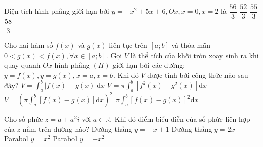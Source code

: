 \begin{ex}%
Diện tích hình phẳng giới hạn bởi $y = -x^2 + 5x + 6, Ox, x = 0, x = 2$ là
\choice
{$\dfrac{56}{3}$}
{$\dfrac{52}{3}$}
{$\dfrac{55}{3}$}
{\True $\dfrac{58}{3}$}
\end{ex}




\begin{ex}%
Cho hai hàm số $f(x)$ và $g(x)$ liên tục trên $\left[ a; b \right] $ và thỏa mãn $0 < g(x) < f(x), \forall x \in \left[ a; b \right]$. Gọi $V$ là thể tích của khối tròn xoay sinh ra khi quay quanh $Ox$ hình phẳng $(H)$ giới hạn bởi các đường: $y = f(x), y = g(x), x = a, x = b$. Khi đó $V$ được tính bởi công thức nào sau đây?
\choice
{$V = \displaystyle \int_a^b \left| f(x) - g(x) \right| \mathrm{d}x$}
{\True $V = \displaystyle \pi \int_a^b \left[ f^2(x) - g^2(x) \right] \mathrm{d}x$}
{$V = \left( \displaystyle \pi \int_a^b \left[ f(x) - g(x) \right] \mathrm{d}x\right) ^2$}
{$\displaystyle \pi \int_a^b \left[ f(x) - g(x) \right]^2 \mathrm{d}x$}
\end{ex}





\begin{ex}%
Cho số phức $z = a + a^2i$ với $a \in \mathbb{R}$. Khi đó điểm biểu diễn của số phức liên hợp của $z$ nằm trên đường nào?
\choice
{Đường thẳng $y = -x + 1$}
{Đường thẳng $y = 2x$}
{Parabol $y = x^2$}
{\True Parabol $y = -x^2$}
\end{ex}



